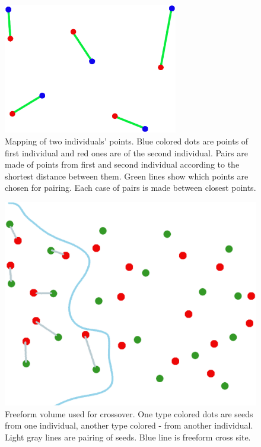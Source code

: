 \documentclass[12pt]{report}
\begin{document}
\begin{figure}
    \centering
    \includegraphics[width=3.0in]{individuals_map}
    \caption{Mapping of two individuals' points. Blue colored dots are points of first individual and red ones are of the second individual. Pairs are made of points from first and second individual according to the shortest distance between them. Green lines show which points are chosen for pairing. Each case of pairs is made between closest points.}
    \label{mappingindividuals}
\end{figure}

\begin{figure}
    \centering
    \includegraphics[width=5.0in]{3d_map}
    \caption{Freeform volume used for crossover. One type colored dots are seeds from one individual, another type colored - from another individual. Light gray lines are pairing of seeds. Blue line is freeform cross site.}
    \label{3d_map}
\end{figure}
\end{document}
